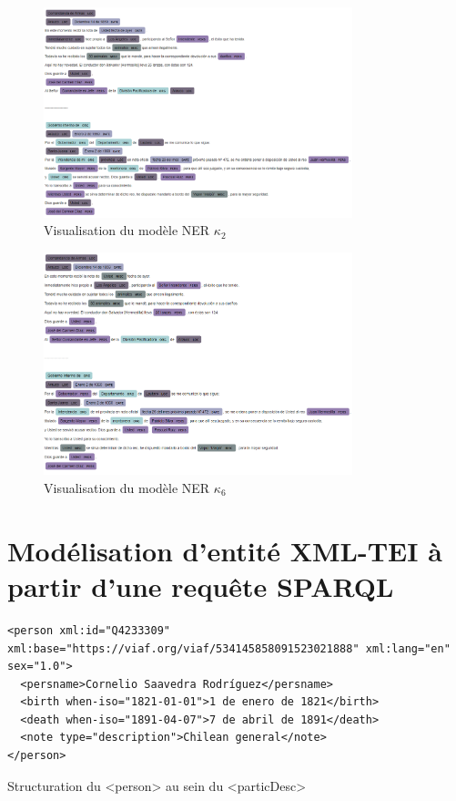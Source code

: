 \begin{figure}
    \centering
    \includegraphics[width=0.8\textwidth]{annexes/img/k2_viz.png}
    \caption{Visualisation du modèle NER $\kappa_2$}
    \label{fig:k2_viz}
\end{figure}

\begin{figure}
    \centering
    \includegraphics[width=0.8\textwidth]{annexes/img/k6_viz.png}
    \caption{Visualisation du modèle NER $\kappa_6$}
    \label{fig:k6_viz}
\end{figure}

\chapter{Modélisation d'entité XML-TEI à partir d'une requête SPARQL}

\begin{listing}[h]
	        \begin{verbatim}
<person xml:id="Q4233309" xml:base="https://viaf.org/viaf/534145858091523021888" xml:lang="en" sex="1.0">
  <persname>Cornelio Saavedra Rodríguez</persname>
  <birth when-iso="1821-01-01">1 de enero de 1821</birth>
  <death when-iso="1891-04-07">7 de abril de 1891</death>
  <note type="description">Chilean general</note>
</person>
	        \end{verbatim}
        	\caption{Structuration du <person> au sein du <particDesc>}
        	\label{code:ent_pers}
\end{listing}

